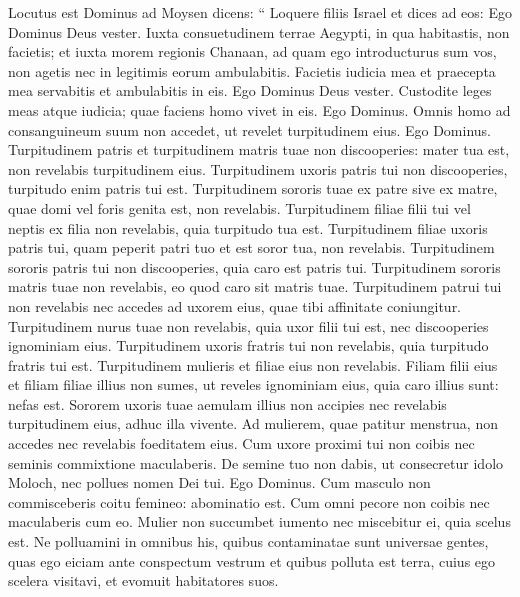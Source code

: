 \begin{biblechapter}
\begin{biblechapter}
\begin{biblechapter}
\begin{biblechapter}
\begin{biblechapter}
\begin{biblechapter}
\begin{biblechapter}
\begin{biblechapter}
\begin{biblechapter}
\begin{biblechapter}
\begin{biblechapter}
\begin{biblechapter}
\begin{biblechapter}
\begin{biblechapter}
\begin{biblechapter}
\begin{biblechapter}
\begin{biblechapter}
\begin{biblechapter}
\verse Locutus est Dominus ad Moysen dicens: 
\verse “ Loquere filiis Israel et dices ad eos: Ego Dominus Deus vester. 
\verse Iuxta consuetudinem terrae Aegypti, in qua habitastis, non facietis; et iuxta morem regionis Chanaan, ad quam ego introducturus sum vos, non agetis nec in legitimis eorum ambulabitis. 
\verse Facietis iudicia mea et praecepta mea servabitis et ambulabitis in eis. Ego Dominus Deus vester. 
\verse Custodite leges meas atque iudicia; quae faciens homo vivet in eis. Ego Dominus.
 \verse Omnis homo ad consanguineum suum non accedet, ut revelet turpitudinem eius. Ego Dominus.
 \verse Turpitudinem patris et turpitudinem matris tuae non discooperies: mater tua est, non revelabis turpitudinem eius. 
\verse Turpitudinem uxoris patris tui non discooperies, turpitudo enim patris tui est. 
\verse Turpitudinem sororis tuae ex patre sive ex matre, quae domi vel foris genita est, non revelabis. 
\verse Turpitudinem filiae filii tui vel neptis ex filia non revelabis, quia turpitudo tua est. 
\verse Turpitudinem filiae uxoris patris tui, quam peperit patri tuo et est soror tua, non revelabis. 
\verse Turpitudinem sororis patris tui non discooperies, quia caro est patris tui. 
\verse Turpitudinem sororis matris tuae non revelabis, eo quod caro sit matris tuae. 
\verse Turpitudinem patrui tui non revelabis nec accedes ad uxorem eius, quae tibi affinitate coniungitur. 
\verse Turpitudinem nurus tuae non revelabis, quia uxor filii tui est, nec discooperies ignominiam eius. 
\verse Turpitudinem uxoris fratris tui non revelabis, quia turpitudo fratris tui est.
 \verse Turpitudinem mulieris et filiae eius non revelabis. Filiam filii eius et filiam filiae illius non sumes, ut reveles ignominiam eius, quia caro illius sunt: nefas est. 
\verse Sororem uxoris tuae aemulam illius non accipies nec revelabis turpitudinem eius, adhuc illa vivente.
 \verse Ad mulierem, quae patitur menstrua, non accedes nec revelabis foeditatem eius. 
\verse Cum uxore proximi tui non coibis nec seminis commixtione maculaberis.
 \verse De semine tuo non dabis, ut consecretur idolo Moloch, nec pollues nomen Dei tui. Ego Dominus.
 \verse Cum masculo non commisceberis coitu femineo: abominatio est.
 \verse Cum omni pecore non coibis nec maculaberis cum eo. Mulier non succumbet iumento nec miscebitur ei, quia scelus est.
 \verse Ne polluamini in omnibus his, quibus contaminatae sunt universae gentes, quas ego eiciam ante conspectum vestrum 
\verse et quibus polluta est terra, cuius ego scelera visitavi, et evomuit habitatores suos. 

\end{biblechapter}
\end{biblechapter}
\end{biblechapter}
\end{biblechapter}
\end{biblechapter}
\end{biblechapter}
\end{biblechapter}
\end{biblechapter}
\end{biblechapter}
\end{biblechapter}
\end{biblechapter}
\end{biblechapter}
\end{biblechapter}
\end{biblechapter}
\end{biblechapter}
\end{biblechapter}
\end{biblechapter}
\end{biblechapter}
